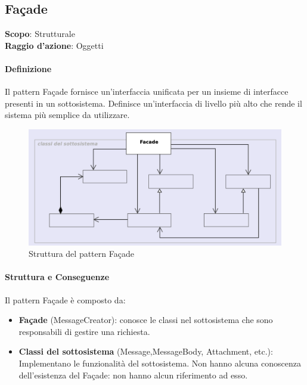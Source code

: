 \subsection{Façade}
\label{facade}

\textbf{Scopo}: Strutturale \\
\textbf{Raggio d'azione}: Oggetti

\paragraph{Definizione} Il pattern Façade fornisce un'interfaccia unificata per un insieme di interfacce presenti in un sottosistema. Definisce un'interfaccia di livello più alto che rende il sistema più semplice da utilizzare.

\begin{figure}[H]
    \centering
    \includegraphics[width=1\linewidth]{assets/pattern/facade/facade-struttura.png}
    \caption{Struttura del pattern Façade}
\end{figure}

\paragraph{Struttura e Conseguenze} Il pattern Façade è composto da:
\begin{itemize}
    \item \textbf{Façade} (MessageCreator): conosce le classi nel sottosistema che sono responsabili di gestire una richiesta. 
    \item \textbf{Classi del sottosistema} (Message,MessageBody, Attachment, etc.): Implementano le funzionalità del sottosistema. Non hanno alcuna conoscenza dell’esistenza del Façade: non hanno alcun riferimento ad esso.
\end{itemize}

